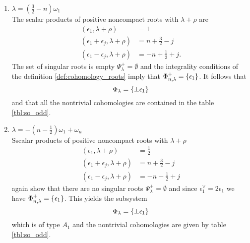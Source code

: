 \begin{enumerate}
 \item $\lambda = (\frac{3}{2} - n)\omega_1  $\\
      The scalar products of positive noncompact roots with $\lambda+\rho$ are
      \begin{align*}
	(\epsilon_1, \lambda+\rho) &= 1 \\
	(\epsilon_1+\epsilon_j,\lambda+\rho) &=  n+\frac{3}{2}-j \\
	(\epsilon_1-\epsilon_j,\lambda+\rho) &= -n + \frac{1}{2} + j.
      \end{align*}
      The set of singular roots is empty $\Psi^+_\lambda = \emptyset$ and the integrality conditions of the definition \ref{def:cohomology_roots} imply that $\Phi^+_{n,\lambda} = \{ \epsilon_1 \}$. It follows that
      \[
       \Phi_\lambda = \{ \pm \epsilon_1 \} 
      \]
      and that all the nontrivial cohomologies are contained in the table \ref{tbl:so_odd}.
      
 \item $\lambda = -(n-\frac{1}{2})\omega_1 + \omega_n  $\\
      Sscalar products of positive noncompact roots with $\lambda+\rho$
      \begin{align*}
	(\epsilon_1, \lambda+\rho) &= \frac{1}{2} \\
	(\epsilon_1+\epsilon_j,\lambda+\rho) &=  n+\frac{3}{2}-j \\
	(\epsilon_1-\epsilon_j,\lambda+\rho) &= -n-\frac{1}{2}+j
      \end{align*}
      again show that there are no singular roots $\Psi^+_\lambda = \emptyset$ and since $\epsilon_1^\vee = 2\epsilon_1$ we have $\Phi^+_{n,\lambda} = \{ \epsilon_1 \}$. This yields the subsystem
      \[
       \Phi_\lambda = \{ \pm \epsilon_1 \} 
      \]
      which is of type $A_1$ and the nontrivial cohomologies are given by table \ref{tbl:so_odd}. 
\end{enumerate}


